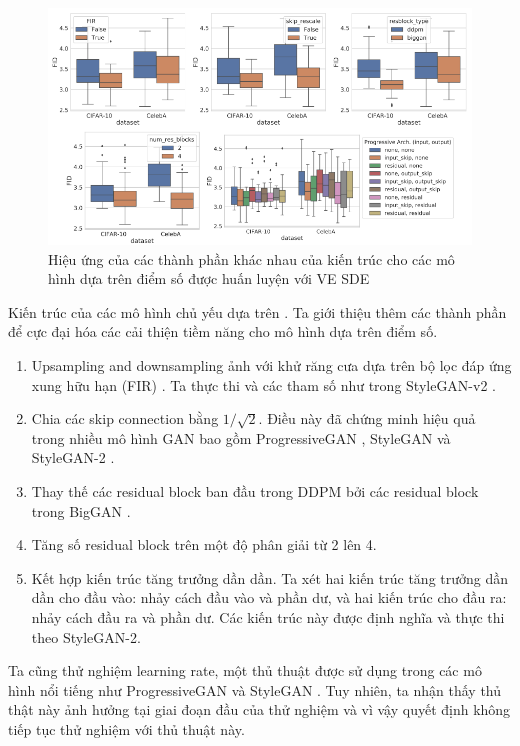 \documentclass{article} %
\begin{document}
\begin{figure}[h!]
    \centering
    \includegraphics[width=0.8\linewidth]{figures/10.png}
    \caption{Hiệu ứng của các thành phần khác nhau của kiến trúc cho các mô hình dựa trên điểm số được huấn luyện với VE SDE}
    \label{fig:10}
\end{figure}

Kiến trúc của các mô hình chủ yếu dựa trên \citep{ho2020denoising}.
Ta giới thiệu thêm các thành phần để cực đại hóa các cải thiện tiềm năng cho mô hình dựa trên điểm số.

\begin{enumerate}
    \item Upsampling and downsampling ảnh với khử răng cưa dựa trên bộ lọc đáp ứng xung hữu hạn (FIR) \citep{zhang2019making}.
    Ta thực thi và các tham số như trong StyleGAN-v2 \citep{karras2020analyzing}.
    \item Chia các skip connection bằng $1/\sqrt{2}$.
    Điều này đã chứng minh hiệu quả trong nhiều mô hình GAN bao gồm ProgressiveGAN \citep{karras2018progressive}, StyleGAN \citep{karras2019style} và StyleGAN-2 \citep{karras2020analyzing}.
    \item Thay thế các residual block ban đầu trong DDPM bởi các residual block trong BigGAN \citep{brock2018large}.
    \item Tăng số residual block trên một độ phân giải từ 2 lên 4.
    \item Kết hợp kiến trúc tăng trưởng dần dần.
    Ta xét hai kiến trúc tăng trưởng dần dần cho đầu vào: nhảy cách đầu vào và phần dư, và hai kiến trúc cho đầu ra: nhảy cách đầu ra và phần dư.
    Các kiến trúc này được định nghĩa và thực thi theo StyleGAN-2.
\end{enumerate}

Ta cũng thử nghiệm learning rate, một thủ thuật được sử dụng trong các mô hình nổi tiếng như ProgressiveGAN \citep{karras2018progressive} và StyleGAN \citep{karras2019style}.
Tuy nhiên, ta nhận thấy thủ thật này ảnh hưởng tại giai đoạn đầu của thử nghiệm và vì vậy quyết định không tiếp tục thử nghiệm với thủ thuật này.
\end{document}
